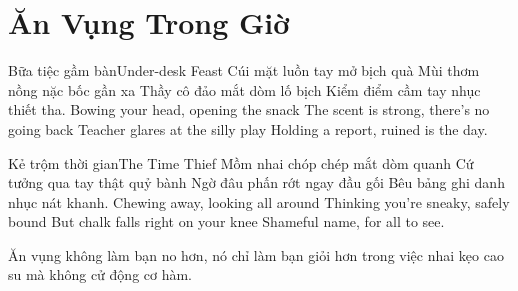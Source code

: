 \chapter{Ăn Vụng Trong Giờ}

\begin{tutuyetbox}{Bữa tiệc gầm bàn}{Under-desk Feast}
Cúi mặt luồn tay mở bịch quà
Mùi thơm nồng nặc bốc gần xa
Thầy cô đảo mắt dòm lố bịch
Kiểm điểm cầm tay nhục thiết tha.
\tcblower
Bowing your head, opening the snack 
The scent is strong, there's no going back 
Teacher glares at the silly play 
Holding a report, ruined is the day.
\end{tutuyetbox}

\begin{tutuyetbox}{Kẻ trộm thời gian}{The Time Thief}
Mồm nhai chóp chép mắt dòm quanh
Cứ tưởng qua tay thật quỷ bành
Ngờ đâu phấn rớt ngay đầu gối
Bêu bảng ghi danh nhục nát khanh.
\tcblower
Chewing away, looking all around 
Thinking you're sneaky, safely bound 
But chalk falls right on your knee 
Shameful name, for all to see.
\end{tutuyetbox}

\begin{ghichu}
Ăn vụng không làm bạn no hơn, nó chỉ làm bạn giỏi hơn trong việc nhai kẹo cao su mà không cử động cơ hàm.
\end{ghichu}